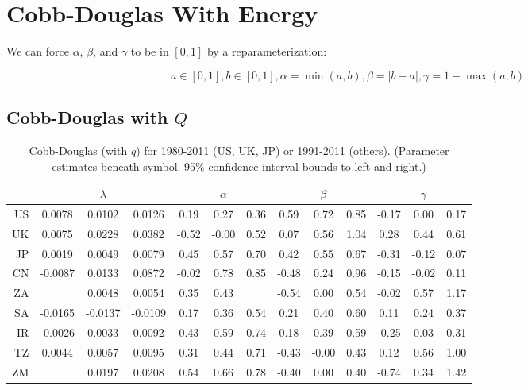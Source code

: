\documentclass[preprint,authoryear,12pt]{elsarticle}\usepackage{graphicx, color}
\begin{document}
\section{Cobb-Douglas With Energy}

We can force $\alpha$, $\beta$, and $\gamma$ to be in $[0,1]$ by a reparameterization:

\[ a \in[0,1], b \in [0,1], \alpha=\min(a,b), \beta=|b-a|, \gamma = 1-\max(a,b) \]

\subsection{Cobb-Douglas with $Q$}

\begin{table}[ht]
\begin{center}
\caption{Cobb-Douglas (with $q$) for 1980-2011 (US, UK, JP) or 1991-2011 (others). (Parameter estimates beneath symbol. 95\% confidence interval bounds to left and right.)}
{\tiny
\begin{tabular}{r|ccc|ccc|ccc|ccc}
  \hline
 &   & $\lambda$ &   &   & $\alpha$ &   &   & $\beta$ &   &   & $\gamma$ &   \\ 
  \hline
US & 0.0078 & 0.0102 & 0.0126 & 0.19 & 0.27 & 0.36 & 0.59 & 0.72 & 0.85 & -0.17 & 0.00 & 0.17 \\ 
  UK & 0.0075 & 0.0228 & 0.0382 & -0.52 & -0.00 & 0.52 & 0.07 & 0.56 & 1.04 & 0.28 & 0.44 & 0.61 \\ 
  JP & 0.0019 & 0.0049 & 0.0079 & 0.45 & 0.57 & 0.70 & 0.42 & 0.55 & 0.67 & -0.31 & -0.12 & 0.07 \\ 
  CN & -0.0087 & 0.0133 & 0.0872 & -0.02 & 0.78 & 0.85 & -0.48 & 0.24 & 0.96 & -0.15 & -0.02 & 0.11 \\ 
  ZA &  & 0.0048 & 0.0054 & 0.35 & 0.43 &  & -0.54 & 0.00 & 0.54 & -0.02 & 0.57 & 1.17 \\ 
  SA & -0.0165 & -0.0137 & -0.0109 & 0.17 & 0.36 & 0.54 & 0.21 & 0.40 & 0.60 & 0.11 & 0.24 & 0.37 \\ 
  IR & -0.0026 & 0.0033 & 0.0092 & 0.43 & 0.59 & 0.74 & 0.18 & 0.39 & 0.59 & -0.25 & 0.03 & 0.31 \\ 
  TZ & 0.0044 & 0.0057 & 0.0095 & 0.31 & 0.44 & 0.71 & -0.43 & -0.00 & 0.43 & 0.12 & 0.56 & 1.00 \\ 
  ZM &  & 0.0197 & 0.0208 & 0.54 & 0.66 & 0.78 & -0.40 & 0.00 & 0.40 & -0.74 & 0.34 & 1.42 \\ 
   \hline
\end{tabular}
}
\end{center}
\end{table}
\end{document}
